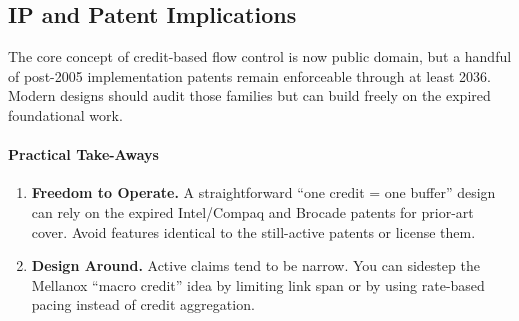 \subsection{IP and Patent Implications}

The core concept of credit-based flow control is now public domain, but a
handful of post-2005 implementation patents remain enforceable through
at least 2036.  Modern designs should audit those families but can build
freely on the expired foundational work.


\paragraph{Practical Take-Aways}
\begin{enumerate}
\item \textbf{Freedom to Operate.}  A straightforward ``one credit = one
buffer'' design can rely on the expired Intel/Compaq and Brocade patents
for prior-art cover.  Avoid features identical to the still-active
patents or license them.
\item \textbf{Design Around.}  Active claims tend to be narrow.  You can
sidestep the Mellanox ``macro credit'' idea by limiting link span or by
using rate-based pacing instead of credit aggregation.
\end{enumerate}






 

%
%
%
%
%
